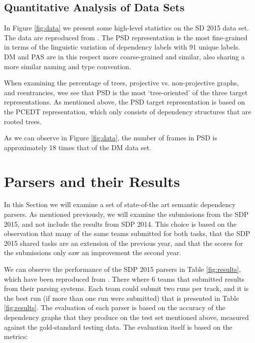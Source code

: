\subsection{Quantitative Analysis of Data Sets}
\label{sec:quantitative}

In Figure \ref{fig:data} we present some high-level statistics on the SD 2015 data set. The data are reproduced from . The PSD representation is the most fine-grained in terms of the linguistic variation of dependency labels with 91 unique labels. DM and PAS are in this respect more coarse-grained and similar, also sharing a more similar naming and type convention.

When examining the percentage of trees, projective vs. non-projective graphs, and reentrancies, wee see that PSD is the most `tree-oriented' of the three target representations. As mentioned above, the PSD target representation is based on the PCEDT representation, which only consists of dependency structures that are rooted trees. 

As we can observe in Figure \ref{fig:data}, the number of frames in PSD is approximately 18 times that of the DM data set. 

\section{Parsers and their Results}
\label{sec:parsers}

In this Section we will examine a set of state-of-the art semantic dependency parsers. As mentioned previously, we will examine the submissions from the SDP 2015, and not include the results from SDP 2014. This choice is based on the observation that many of the same teams submitted for both tasks, that the SDP 2015 shared tasks are an extension of the previous year, and that the scores for the submissions only saw an improvement the second year.

We can observe the performance of the SDP 2015 parsers in Table \ref{fig:results}, which have been reproduced from . There where 6 teams that submitted results from their parsing systems. Each team could submit two runs per track, and it is the best run (if more than one run were submitted) that is presented in Table \ref{fig:results}. The evaluation of each parser is based on the accuracy of the dependency graphs that they produce on the test set mentioned above, measured against the gold-standard testing data. The evaluation itself is based on the metrics: 


